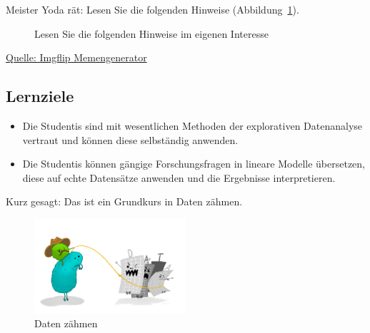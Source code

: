 \documentclass[
  a4paper,
  DIV=11]{scrreprt}
\theoremstyle{definition}
\theoremstyle{definition}
\theoremstyle{definition}
\theoremstyle{remark}
\begin{document}
Meister Yoda rät: Lesen Sie die folgenden Hinweise
(Abbildung~\ref{fig-yoda}).

\begin{figure}


\caption{\label{fig-yoda}Lesen Sie die folgenden Hinweise im eigenen
Interesse}

\end{figure}%

\href{https://imgflip.com/memegenerator}{Quelle: Imgflip Memengenerator}

\subsection{Lernziele}\label{lernziele}

\begin{itemize}
\item
  Die Studentis sind mit wesentlichen Methoden der explorativen
  Datenanalyse vertraut und können diese selbständig anwenden.
\item
  Die Studentis können gängige Forschungsfragen in lineare Modelle
  übersetzen, diese auf echte Datensätze anwenden und die Ergebnisse
  interpretieren.
\end{itemize}

Kurz gesagt: Das ist ein Grundkurs in Daten zähmen.

\begin{figure}[H]

{\centering \includegraphics[width=0.5\textwidth,height=\textheight]{img/datenzaehmen.png}

}

\caption{Daten zähmen}

\end{figure}%
\end{document}
